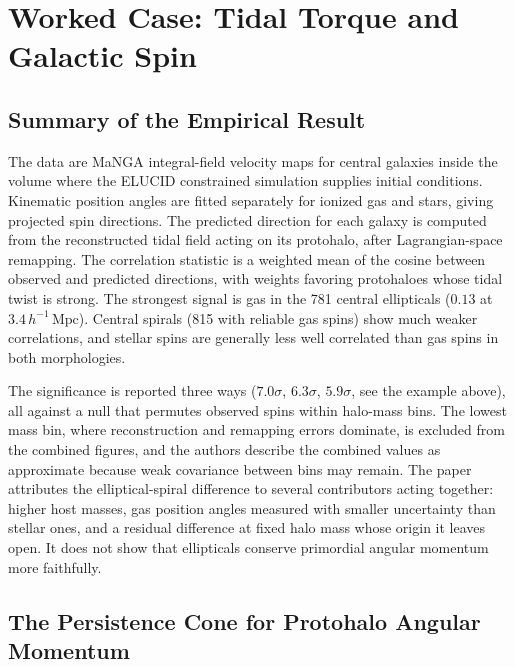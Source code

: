\documentclass[12pt,a4paper,twoside,openright]{book}
\theoremstyle{plain}
\theoremstyle{definition}
\theoremstyle{remark}
\begin{document}
\section{Worked Case: Tidal Torque and Galactic Spin \texorpdfstring{\cite{sheng2026tidaltorque}}{}}

\subsection{Summary of the Empirical Result}

The data are MaNGA integral-field velocity maps for central galaxies inside the volume where the ELUCID constrained simulation supplies initial conditions. Kinematic position angles are fitted separately for ionized gas and stars, giving projected spin directions. The predicted direction for each galaxy is computed from the reconstructed tidal field acting on its protohalo, after Lagrangian-space remapping. The correlation statistic is a weighted mean of the cosine between observed and predicted directions, with weights favoring protohaloes whose tidal twist is strong. The strongest signal is gas in the 781 central ellipticals ($0.13$ at $3.4\,h^{-1}\,\mathrm{Mpc}$). Central spirals (815 with reliable gas spins) show much weaker correlations, and stellar spins are generally less well correlated than gas spins in both morphologies.

The significance is reported three ways ($7.0\sigma$, $6.3\sigma$, $5.9\sigma$, see the example above), all against a null that permutes observed spins within halo-mass bins. The lowest mass bin, where reconstruction and remapping errors dominate, is excluded from the combined figures, and the authors describe the combined values as approximate because weak covariance between bins may remain. The paper attributes the elliptical-spiral difference to several contributors acting together: higher host masses, gas position angles measured with smaller uncertainty than stellar ones, and a residual difference at fixed halo mass whose origin it leaves open. It does not show that ellipticals conserve primordial angular momentum more faithfully.

\subsection{The Persistence Cone for Protohalo Angular Momentum}
\end{document}
